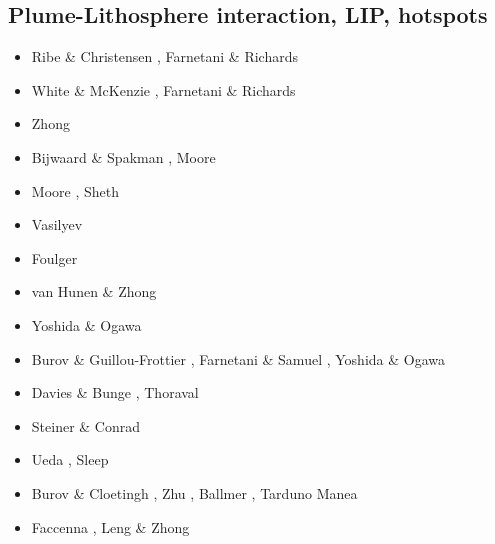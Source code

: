 \subsection{Plume-Lithosphere interaction, LIP, hotspots}

\begin{scriptsize}
\begin{itemize}
\item[\nineteenninetyfour] Ribe \& Christensen \cite{rich94}, Farnetani \& Richards \cite{fari94}
\item[\nineteenninetyfive] White \& McKenzie \cite{whmc95}, Farnetani \& Richards \cite{fari95}
\item[\nineteenninetysix] Zhong \etal \cite{zhgm96}
\item[\nineteenninetyeight] Bijwaard \& Spakman \cite{bisp98}, Moore \etal \cite{most98}
\item[\nineteenninetynine] Moore \etal \cite{most99}, Sheth \cite{shet99}
\item[\twothousandone] Vasilyev \etal \cite{vapy01}
\item[\twothousandtwo] Foulger \cite{foul02}
\item[\twothousandthree] van Hunen \& Zhong \cite{vazh03}
\item[\twothousandfour] Yoshida \& Ogawa \cite{yoog04}
\item[\twothousandfive] Burov \& Guillou-Frottier \cite{bugu05}, Farnetani \& Samuel \cite{fasa05}, 
                        Yoshida \& Ogawa \cite{yoog05}
\item[\twothousandsix] Davies \& Bunge \cite{dabu06}, Thoraval \etal \cite{thtd06}
\item[\twothousandseven] Steiner \& Conrad \cite{stco07}
\item[\twothousandeight] Ueda \etal \cite{uegs08}, Sleep \cite{slee08}
\item[\twothousandnine] Burov \& Cloetingh \cite{bucl09}, Zhu \etal \cite{zhgy09},
                        Ballmer \etal \cite{baiv10}, Tarduno \etal \cite{tabs09}
                        Manea \etal \cite{maml09}
\item[\twothousandten] Faccenna \etal \cite{fabl10}, Leng \& Zhong \cite{lezh10}

\end{itemize}
\end{scriptsize}
